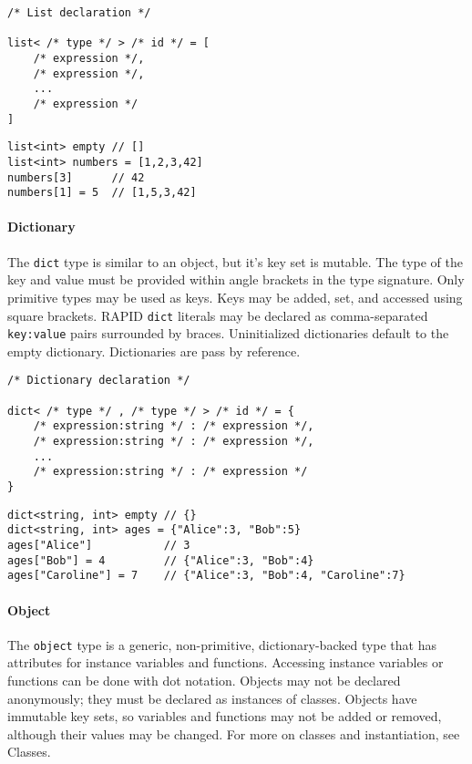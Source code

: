 \begin{verbatim}
/* List declaration */

list< /* type */ > /* id */ = [
    /* expression */,
    /* expression */,
    ...
    /* expression */
]
\end{verbatim}

\begin{verbatim}
list<int> empty // []
list<int> numbers = [1,2,3,42]
numbers[3]      // 42
numbers[1] = 5  // [1,5,3,42]
\end{verbatim}

\paragraph{Dictionary}\label{dictionary}

The \texttt{dict} type is similar to an object, but it's key set is
mutable. The type of the key and value must be provided within angle
brackets in the type signature. Only primitive types may be used as
keys. Keys may be added, set, and accessed using square brackets. RAPID
\texttt{dict} literals may be declared as comma-separated
\texttt{key:value} pairs surrounded by braces. Uninitialized
dictionaries default to the empty dictionary. Dictionaries are pass by
reference.

\begin{verbatim}
/* Dictionary declaration */

dict< /* type */ , /* type */ > /* id */ = {
    /* expression:string */ : /* expression */,
    /* expression:string */ : /* expression */,
    ...
    /* expression:string */ : /* expression */
}
\end{verbatim}

\begin{verbatim}
dict<string, int> empty // {}
dict<string, int> ages = {"Alice":3, "Bob":5}
ages["Alice"]           // 3
ages["Bob"] = 4         // {"Alice":3, "Bob":4}
ages["Caroline"] = 7    // {"Alice":3, "Bob":4, "Caroline":7}
\end{verbatim}

\paragraph{Object}\label{object}

The \texttt{object} type is a generic, non-primitive, dictionary-backed
type that has attributes for instance variables and functions. Accessing
instance variables or functions can be done with dot notation. Objects
may not be declared anonymously; they must be declared as instances of
classes. Objects have immutable key sets, so variables and functions may
not be added or removed, although their values may be changed. For more
on classes and instantiation, see Classes.

